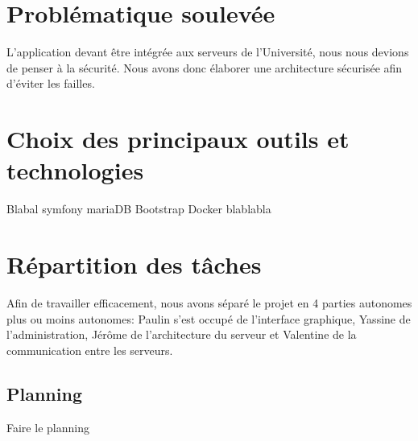 \section{Problématique soulevée}

\par L'application devant être intégrée aux serveurs de l'Université, nous nous devions de penser à la sécurité. Nous avons donc élaborer une architecture sécurisée afin d'éviter les failles. 

\section{Choix des principaux outils et technologies}

Blabal symfony mariaDB Bootstrap Docker blablabla

\section{Répartition des tâches}

\par Afin de travailler efficacement, nous avons séparé le projet en 4 parties autonomes plus ou moins autonomes: Paulin s'est occupé de l'interface graphique, Yassine de l'administration, Jérôme de l'architecture du serveur et Valentine de la communication entre les serveurs.

\subsection{Planning}

Faire le planning